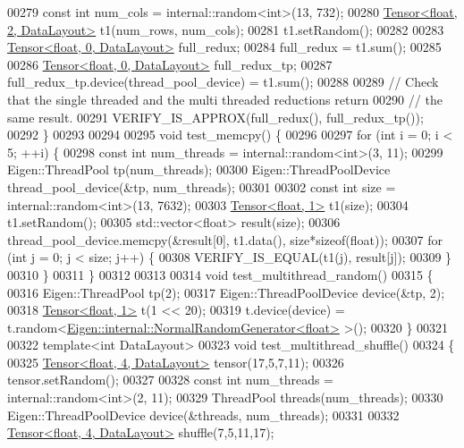 \begin{DoxyCode}
00279   \textcolor{keyword}{const} \textcolor{keywordtype}{int} num\_cols = internal::random<int>(13, 732);
00280   \hyperlink{class_eigen_1_1_tensor}{Tensor<float, 2, DataLayout>} t1(num\_rows, num\_cols);
00281   t1.setRandom();
00282 
00283   \hyperlink{class_eigen_1_1_tensor}{Tensor<float, 0, DataLayout>} full\_redux;
00284   full\_redux = t1.sum();
00285 
00286   \hyperlink{class_eigen_1_1_tensor}{Tensor<float, 0, DataLayout>} full\_redux\_tp;
00287   full\_redux\_tp.device(thread\_pool\_device) = t1.sum();
00288 
00289   \textcolor{comment}{// Check that the single threaded and the multi threaded reductions return}
00290   \textcolor{comment}{// the same result.}
00291   VERIFY\_IS\_APPROX(full\_redux(), full\_redux\_tp());
00292 \}
00293 
00294 
00295 \textcolor{keywordtype}{void} test\_memcpy() \{
00296 
00297   \textcolor{keywordflow}{for} (\textcolor{keywordtype}{int} i = 0; i < 5; ++i) \{
00298     \textcolor{keyword}{const} \textcolor{keywordtype}{int} num\_threads = internal::random<int>(3, 11);
00299     Eigen::ThreadPool tp(num\_threads);
00300     Eigen::ThreadPoolDevice thread\_pool\_device(&tp, num\_threads);
00301 
00302     \textcolor{keyword}{const} \textcolor{keywordtype}{int} size = internal::random<int>(13, 7632);
00303     \hyperlink{class_eigen_1_1_tensor}{Tensor<float, 1>} t1(size);
00304     t1.setRandom();
00305     std::vector<float> result(size);
00306     thread\_pool\_device.memcpy(&result[0], t1.data(), size*\textcolor{keyword}{sizeof}(float));
00307     \textcolor{keywordflow}{for} (\textcolor{keywordtype}{int} j = 0; j < size; j++) \{
00308       VERIFY\_IS\_EQUAL(t1(j), result[j]);
00309     \}
00310   \}
00311 \}
00312 
00313 
00314 \textcolor{keywordtype}{void} test\_multithread\_random()
00315 \{
00316   Eigen::ThreadPool tp(2);
00317   Eigen::ThreadPoolDevice device(&tp, 2);
00318   \hyperlink{class_eigen_1_1_tensor}{Tensor<float, 1>} t(1 << 20);
00319   t.device(device) = t.random<\hyperlink{class_eigen_1_1internal_1_1_normal_random_generator}{Eigen::internal::NormalRandomGenerator<float>}
      >();
00320 \}
00321 
00322 \textcolor{keyword}{template}<\textcolor{keywordtype}{int} DataLayout>
00323 \textcolor{keywordtype}{void} test\_multithread\_shuffle()
00324 \{
00325   \hyperlink{class_eigen_1_1_tensor}{Tensor<float, 4, DataLayout>} tensor(17,5,7,11);
00326   tensor.setRandom();
00327 
00328   \textcolor{keyword}{const} \textcolor{keywordtype}{int} num\_threads = internal::random<int>(2, 11);
00329   ThreadPool threads(num\_threads);
00330   Eigen::ThreadPoolDevice device(&threads, num\_threads);
00331 
00332   \hyperlink{class_eigen_1_1_tensor}{Tensor<float, 4, DataLayout>} shuffle(7,5,11,17);

\end{DoxyCode}
